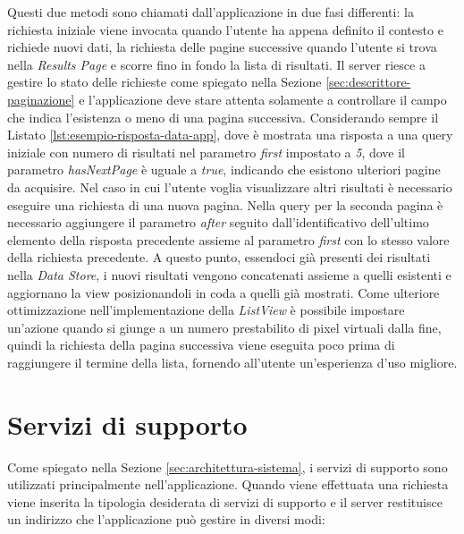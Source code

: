 Questi due metodi sono chiamati dall'applicazione in due fasi differenti: la richiesta iniziale viene invocata quando l'utente ha appena definito il contesto e richiede nuovi dati, la richiesta delle pagine successive quando l'utente si trova nella \emph{Results Page} e scorre fino in fondo la lista di risultati. 
Il server riesce a gestire lo stato delle richieste come spiegato nella Sezione \ref{sec:descrittore-paginazione} e l'applicazione deve stare attenta solamente a controllare il campo che indica l'esistenza o meno di una pagina successiva.
Considerando sempre il Listato \ref{lst:esempio-risposta-data-app}, dove è mostrata una risposta a una query iniziale con numero di risultati nel parametro \emph{first} impostato a \emph{5}, dove il parametro \emph{hasNextPage} è uguale a \emph{true}, indicando che esistono ulteriori pagine da acquisire. Nel caso in cui l'utente voglia visualizzare altri risultati è necessario eseguire una richiesta di una nuova pagina. Nella query per la seconda pagina è necessario aggiungere il parametro \emph{after} seguito dall'identificativo dell'ultimo elemento della risposta precedente assieme al parametro \emph{first} con lo stesso valore della richiesta precedente. A questo punto, essendoci già presenti dei risultati nella \emph{Data Store}, i nuovi risultati vengono concatenati assieme a quelli esistenti e aggiornano la view posizionandoli in coda a quelli già mostrati. Come ulteriore ottimizzazione nell'implementazione della \emph{ListView} è possibile impostare un'azione quando si giunge a un numero prestabilito di pixel virtuali dalla fine, quindi la richiesta della pagina successiva viene eseguita poco prima di raggiungere il termine della lista, fornendo all'utente un'esperienza d'uso migliore.

\section{Servizi di supporto}\label{sec:servizi-supporto-app}

Come spiegato nella Sezione \ref{sec:architettura-sistema}, i servizi di supporto sono utilizzati principalmente nell'applicazione. Quando viene effettuata una richiesta viene inserita la tipologia desiderata di servizi di supporto e il server restituisce un indirizzo che l'applicazione può gestire in diversi modi:

